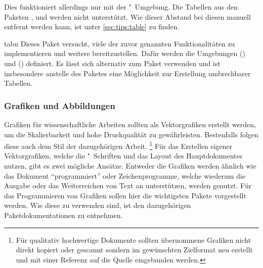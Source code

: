 \begin{packages}
  Dies funktioniert allerdings nur mit der "~Umgebung. 
  Die Tabellen aus den Paketen ,  und 
   werden nicht unterstützt. Wie dieser Abstand bei diesen 
  manuell entfernt werden kann, ist unter \autoref{sec:tips:table} zu finden.
\item[tabu]
  Dieses Paket versucht, viele der zuvor genannten Funktionalitäten zu 
  implementieren und weitere bereitzustellen. Dafür werden die Umgebungen 
  () und () 
  definiert. Es lässt sich alternativ zum Paket  verwenden und 
  ist insbesondere anstelle des Paketes  eine Möglichkeit zur 
  Erstellung umbrechbarer Tabellen.
  
\end{packages}
%



\subsubsection{%
  Grafiken und Abbildungen%
}
%
Grafiken für wissenschaftliche Arbeiten sollten als Vektorgrafiken erstellt 
werden, um die Skalierbarkeit und hohe Druckqualität zu gewährleisten. 
Bestenfalls folgen diese auch dem Stil der dazugehörigen Arbeit.%
\footnote{%
  Für qualitativ hochwertige Dokumente sollten übernommene Grafiken nicht 
  direkt kopiert oder gescannt sondern im gewünschten Zielformat neu erstellt 
  und mit einer Referenz auf die Quelle eingebunden werden.%
}
Für das Erstellen eigener Vektorgrafiken, welche die "~Schriften 
und das Layout des Hauptdokumentes nutzen, gibt es zwei mögliche Ansätze. 
Entweder die Grafiken werden ähnlich wie das Dokument \enquote{programmiert} 
oder Zeichenprogramme, welche wiederum die Ausgabe oder das Weiterreichen von 
Text an  unterstützen, werden genutzt. Für das Programmieren von 
Grafiken sollen hier die wichtigsten Pakete vorgestellt werden. Wie diese zu 
verwenden sind, ist den dazugehörigen Paketdokumentationen zu entnehmen. 

